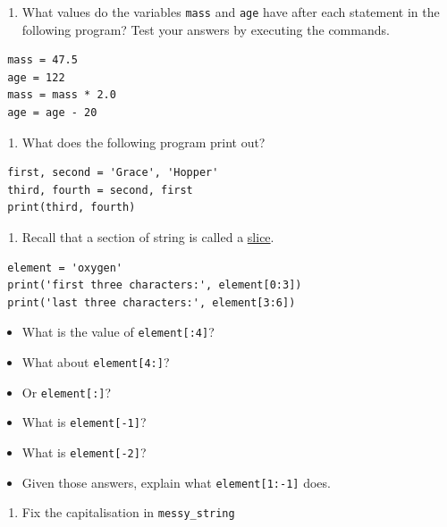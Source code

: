 \documentclass[]{book}
\providecommand{\tightlist}{%
  \setlength{\itemsep}{0pt}\setlength{\parskip}{0pt}}
\theoremstyle{definition}
\theoremstyle{definition}
\theoremstyle{definition}
\theoremstyle{remark}
\begin{document}
\begin{enumerate}
\def\labelenumi{\arabic{enumi}.}
\tightlist
\item
  What values do the variables \texttt{mass} and \texttt{age} have after
  each statement in the following program? Test your answers by
  executing the commands.
\end{enumerate}

\begin{verbatim}
 mass = 47.5
 age = 122
 mass = mass * 2.0
 age = age - 20
\end{verbatim}

\begin{enumerate}
\def\labelenumi{\arabic{enumi}.}
\setcounter{enumi}{1}
\tightlist
\item
  What does the following program print out?
\end{enumerate}

\begin{verbatim}
 first, second = 'Grace', 'Hopper'
 third, fourth = second, first
 print(third, fourth)
\end{verbatim}

\begin{enumerate}
\def\labelenumi{\arabic{enumi}.}
\setcounter{enumi}{2}
\tightlist
\item
  Recall that a section of string is called a
  \href{\%7B\%7B\%20page.root\%20\%7D\%7D/reference/\#slice}{slice}.
\end{enumerate}

\begin{verbatim}
 element = 'oxygen'
 print('first three characters:', element[0:3])
 print('last three characters:', element[3:6])
\end{verbatim}

\begin{itemize}
\tightlist
\item
  What is the value of \texttt{element{[}:4{]}}?
\item
  What about \texttt{element{[}4:{]}}?
\item
  Or \texttt{element{[}:{]}}?
\item
  What is \texttt{element{[}-1{]}}?
\item
  What is \texttt{element{[}-2{]}}?
\item
  Given those answers, explain what \texttt{element{[}1:-1{]}} does.
\end{itemize}

\begin{enumerate}
\def\labelenumi{\arabic{enumi}.}
\setcounter{enumi}{3}
\tightlist
\item
  Fix the capitalisation in \texttt{messy\_string}
\end{enumerate}
\end{document}
